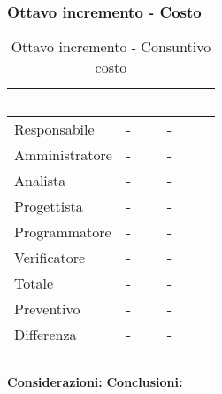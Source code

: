             \subsubsection{Ottavo incremento - Costo} {
                \setlength{\freewidth}{\dimexpr\textwidth-30\tabcolsep}
                \renewcommand{\arraystretch}{1.0}
                \centering
                \setlength{\aboverulesep}{0pt}
                \setlength{\belowrulesep}{0pt}
                \begin{longtable}{C{.4\freewidth} C{.2\freewidth} C{.2\freewidth}}
                \toprule
                \textcolor{white}{\textbf{Ruolo}}&
                \textcolor{white}{\textbf{Ore}}&
                \textcolor{white}{\textbf{Costo}}\\
                \toprule
                \endhead
          
                Responsabile & - & - \\
                Amministratore & - & - \\
                Analista & - & - \\
                Progettista & - & - \\
                Programmatore & - & - \\
                Verificatore & - &- \\
                Totale & - & - \\
                Preventivo & - & - \\
                Differenza & - & - \\
                \bottomrule
                \\
                \caption{Ottavo incremento - Consuntivo costo}
          
                \end{longtable}
                \textbf{Considerazioni:} 
                \textbf{Conclusioni:} 
            }
            
